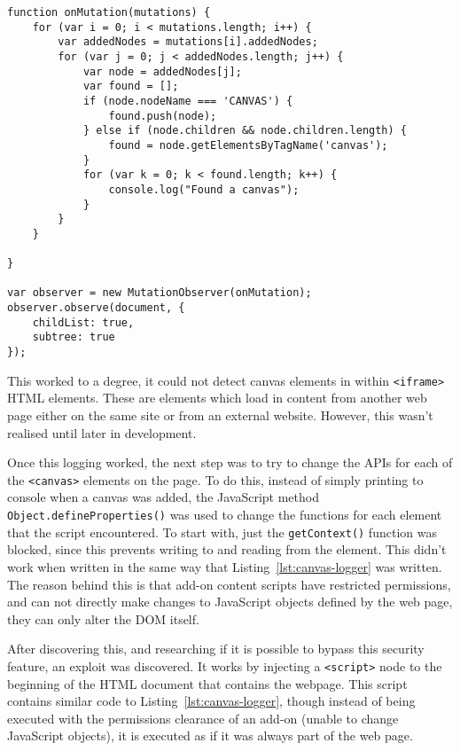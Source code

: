 \begin{lstlisting}[caption={A script that listens to a webpage, and prints to the console when a \texttt{<canvas>} element is added}, label={lst:canvas-logger}]
function onMutation(mutations) {
    for (var i = 0; i < mutations.length; i++) {
        var addedNodes = mutations[i].addedNodes;
        for (var j = 0; j < addedNodes.length; j++) {
            var node = addedNodes[j];
            var found = [];
            if (node.nodeName === 'CANVAS') {
                found.push(node);
            } else if (node.children && node.children.length) {
                found = node.getElementsByTagName('canvas');
            }
            for (var k = 0; k < found.length; k++) {
                console.log("Found a canvas");
            }
        }
    }

}

var observer = new MutationObserver(onMutation);
observer.observe(document, {
    childList: true,
    subtree: true
});
\end{lstlisting}

This worked to a degree, it could not detect canvas elements in within \texttt{<iframe>} HTML elements.
These are elements which load in content from another web page either on the same site or from an external website.
However, this wasn't realised until later in development.

Once this logging worked, the next step was to try to change the APIs for each of the \texttt{<canvas>} elements on the page.
To do this, instead of simply printing to console when a canvas was added, the JavaScript method \texttt{Object.defineProperties()} was used to change the functions for each element that the script encountered.
To start with, just the \texttt{getContext()} function was blocked, since this prevents writing to and reading from the element.
This didn't work when written in the same way that Listing~\ref{lst:canvas-logger} was written.
The reason behind this is that add-on content scripts have restricted permissions, and can not directly make changes to JavaScript objects defined by the web page, they can only alter the DOM itself.

After discovering this, and researching if it is possible to bypass this security feature, an exploit was discovered.
It works by injecting a \texttt{<script>} node to the beginning of the HTML document that contains the webpage.
This script contains similar code to Listing~\ref{lst:canvas-logger}, though instead of being executed with the permissions clearance of an add-on (unable to change JavaScript objects), it is executed as if it was always part of the web page.

